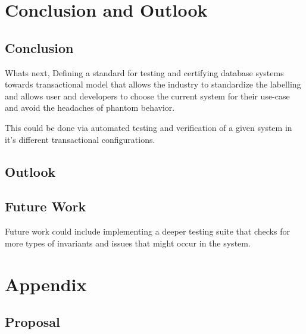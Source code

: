 \documentclass[a4paper,10pt,titlepage]{report}
\begin{document}
    \chapter{Conclusion and Outlook}
    \section*{Conclusion}
    Whats next, Defining a standard for testing and certifying database systems towards transactional model that allows the industry to standardize the labelling and allows user and developers to choose the current system for their use-case and avoid the headaches of phantom behavior.

    This could be done via automated testing and verification of a given system in it's different transactional configurations.

    \section*{Outlook}


    \section{Future Work}
    Future work could include implementing a deeper testing suite that checks for more types of invariants and issues that might occur in the system.





    \newpage


    \chapter{Appendix}

    \pagestyle{empty}
    \printbibliography


    \section{Proposal}
    



\end{document}
